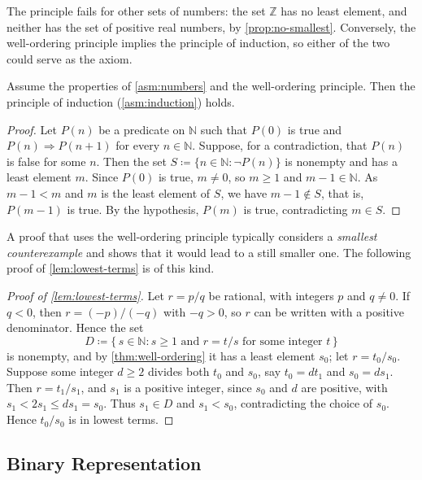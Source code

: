 The principle fails for other sets of numbers: the set $\mathbb Z$ has no least element, and neither has the set of positive real numbers, by \cref{prop:no-smallest}. Conversely, the well-ordering principle implies the principle of induction, so either of the two could serve as the axiom.

\begin{proposition}
\label{prop:wop-implies-induction}
Assume the properties of \cref{asm:numbers} and the well-ordering principle. Then the principle of induction (\cref{asm:induction}) holds.
\end{proposition}

\begin{proof}
Let $P(n)$ be a predicate on $\mathbb N$ such that $P(0)$ is true and $P(n)\Rightarrow P(n+1)$ for every $n\in\mathbb N$. Suppose, for a contradiction, that $P(n)$ is false for some $n$. Then the set $S\coloneqq\{n\in\mathbb N:\neg P(n)\}$ is nonempty and has a least element $m$. Since $P(0)$ is true, $m\ne0$, so $m\ge1$ and $m-1\in\mathbb N$. As $m-1<m$ and $m$ is the least element of $S$, we have $m-1\notin S$, that is, $P(m-1)$ is true. By the hypothesis, $P(m)$ is true, contradicting $m\in S$.
\end{proof}

A proof that uses the well-ordering principle typically considers a \emph{smallest counterexample} and shows that it would lead to a still smaller one. The following proof of \cref{lem:lowest-terms} is of this kind.

\begin{proof}[Proof of \cref{lem:lowest-terms}]
Let $r=p/q$ be rational, with integers $p$ and $q\ne0$. If $q<0$, then $r=(-p)/(-q)$ with $-q>0$, so $r$ can be written with a positive denominator. Hence the set
\[
D\coloneqq\{\,s\in\mathbb N: s\ge1\text{ and }r=t/s\text{ for some integer }t\,\}
\]
is nonempty, and by \cref{thm:well-ordering} it has a least element $s_0$; let $r=t_0/s_0$. Suppose some integer $d\ge2$ divides both $t_0$ and $s_0$, say $t_0=dt_1$ and $s_0=ds_1$. Then $r=t_1/s_1$, and $s_1$ is a positive integer, since $s_0$ and $d$ are positive, with $s_1<2s_1\le ds_1=s_0$. Thus $s_1\in D$ and $s_1<s_0$, contradicting the choice of $s_0$. Hence $t_0/s_0$ is in lowest terms.
\end{proof}

\subsection{Binary Representation}

